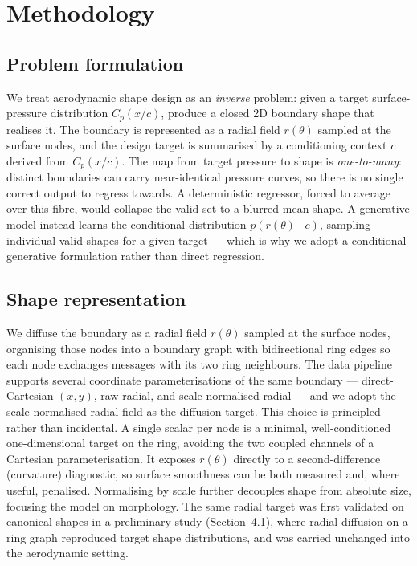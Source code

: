 \section{Methodology}

\subsection{Problem formulation}

We treat aerodynamic shape design as an \emph{inverse} problem: given a target surface-pressure
distribution $C_p(x/c)$, produce a closed 2D boundary shape that realises it. The boundary is
represented as a radial field $r(\theta)$ sampled at the surface nodes, and the design target is
summarised by a conditioning context $c$ derived from $C_p(x/c)$. The map from target pressure to
shape is \emph{one-to-many}: distinct boundaries can carry near-identical pressure curves, so there
is no single correct output to regress towards. A deterministic regressor, forced to average over
this fibre, would collapse the valid set to a blurred mean shape. A generative model instead learns
the conditional distribution $p(r(\theta) \mid c)$, sampling individual valid shapes for a given
target --- which is why we adopt a conditional generative formulation rather than direct regression.

\subsection{Shape representation}

We diffuse the boundary as a radial field $r(\theta)$ sampled at the surface nodes, organising those
nodes into a boundary graph with bidirectional ring edges so each node exchanges messages with its
two ring neighbours. The data pipeline supports several coordinate parameterisations of the same
boundary --- direct-Cartesian $(x, y)$, raw radial, and scale-normalised radial --- and we adopt the
scale-normalised radial field as the diffusion target.
This choice is principled rather than incidental. A single scalar per node is a minimal,
well-conditioned one-dimensional target on the ring, avoiding the two coupled channels of a
Cartesian parameterisation. It exposes $r(\theta)$ directly to a second-difference (curvature)
diagnostic, so surface smoothness can be both measured and, where useful, penalised. Normalising by
scale further decouples shape from absolute size, focusing the model on morphology. The same radial
target was first validated on canonical shapes in a preliminary study (Section~4.1), where radial
diffusion on a ring graph reproduced target shape distributions, and was carried unchanged into the
aerodynamic setting.

